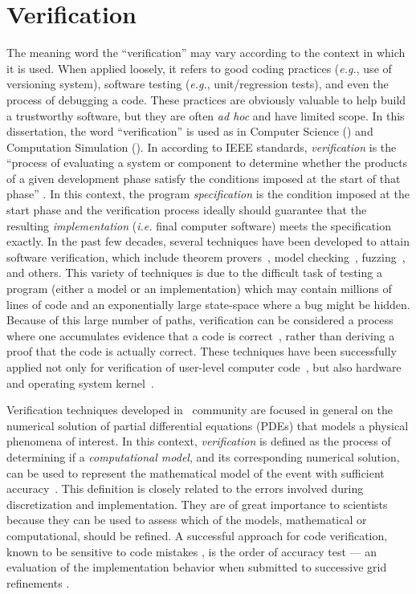 \section{Verification}

The meaning word the ``verification'' may vary according to the context in which it is used. When applied loosely, it refers to good coding practices
({\em e.g.}, use of versioning system), software testing ({\em e.g.}, unit/regression tests), and even the process of debugging a code. These practices are obviously valuable to help build a trustworthy software, but they are often \emph{ad hoc} and have limited scope. 
In this dissertation, the word ``verification'' is used as in Computer Science (\cs) and Computation Simulation (\cse). 
In \cs{} according to IEEE standards, 
\emph{verification} is the ``process of evaluating a 
system or component to determine whether the products of a given 
development phase satisfy the conditions imposed at the start of
that phase'' \cite{159342}.
%
In this context, the program \emph{specification} is the condition
imposed at the start phase and the verification process
ideally should guarantee that the resulting \emph{implementation}
({\em i.e.} final computer software) meets the 
specification exactly. 
%
In the past
few decades, several techniques have been developed
to attain software verification, which include theorem
provers~\cite{Bowen95}, 
model checking~\cite{Clarke08},
fuzzing~\cite{bird83, godefroid08},  and others. This variety of
techniques is due to the difficult task of testing a program (either
a model or an implementation) which may contain millions of lines
of code and an exponentially large state-space where a
bug might be 
hidden. Because of this large number of paths,
verification can be considered a
process where one accumulates evidence that a code is
correct~\cite{roach98}, rather than deriving a proof that the code is actually correct.
These techniques have been successfully applied not only for
verification of 
user-level computer code~\cite{1646374}, but also
hardware~\cite{seger92} and  
operating system kernel~\cite{1629596}. 

Verification techniques developed in \cse~community are focused in general on the
numerical solution of partial differential equations (PDEs) that 
models a physical phenomena of
interest. In this context, 
\emph{verification} is defined as the process of determining if a
\emph{computational model}, and its corresponding numerical solution,   
can be used to represent the mathematical model of the event with 
sufficient accuracy~\cite{babuska04}.
%
This definition is closely related to the errors involved during
discretization and implementation. They are of great importance to
scientists because they can be used to assess which of the models,
mathematical or computational, should be refined.  A successful
approach for code verification, known to be sensitive to code
mistakes \cite{roach98}, is the order of accuracy test --- an
evaluation of the implementation behavior when submitted to successive
grid refinements \cite{roach98}. 

